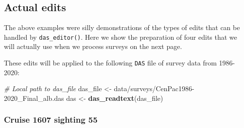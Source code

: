 \documentclass[
]{book}
\newenvironment{Shaded}{\begin{snugshade}}{\end{snugshade}}
\newcommand{\AttributeTok}[1]{\textcolor[rgb]{0.13,0.29,0.53}{#1}}
\newcommand{\CommentTok}[1]{\textcolor[rgb]{0.56,0.35,0.01}{\textit{#1}}}
\newcommand{\DecValTok}[1]{\textcolor[rgb]{0.00,0.00,0.81}{#1}}
\newcommand{\FunctionTok}[1]{\textcolor[rgb]{0.13,0.29,0.53}{\textbf{#1}}}
\newcommand{\NormalTok}[1]{#1}
\newcommand{\OtherTok}[1]{\textcolor[rgb]{0.56,0.35,0.01}{#1}}
\newcommand{\SpecialCharTok}[1]{\textcolor[rgb]{0.81,0.36,0.00}{\textbf{#1}}}
\newcommand{\StringTok}[1]{\textcolor[rgb]{0.31,0.60,0.02}{#1}}
\begin{document}
\begin{Shaded}
\end{Shaded}

\hypertarget{actual-edits}{%
\subsection*{Actual edits}\label{actual-edits}}

The above examples were silly demonstrations of the types of edits that can be handled by \texttt{das\_editor()}. Here we show the preparation of four edits that we will actually use when we process surveys on the next page.

These edits will be applied to the following \texttt{DAS} file of survey data from 1986-2020:

\begin{Shaded}
\begin{Highlighting}[]
\CommentTok{\# Local path to das\_file}
\NormalTok{das\_file }\OtherTok{\textless{}{-}} \StringTok{\textquotesingle{}data/surveys/CenPac1986{-}2020\_Final\_alb.das\textquotesingle{}}
\NormalTok{das }\OtherTok{\textless{}{-}} \FunctionTok{das\_readtext}\NormalTok{(das\_file)}
\end{Highlighting}
\end{Shaded}

\hypertarget{cruise-1607-sighting-55}{%
\subsubsection*{Cruise 1607 sighting 55}\label{cruise-1607-sighting-55}}
\end{document}
